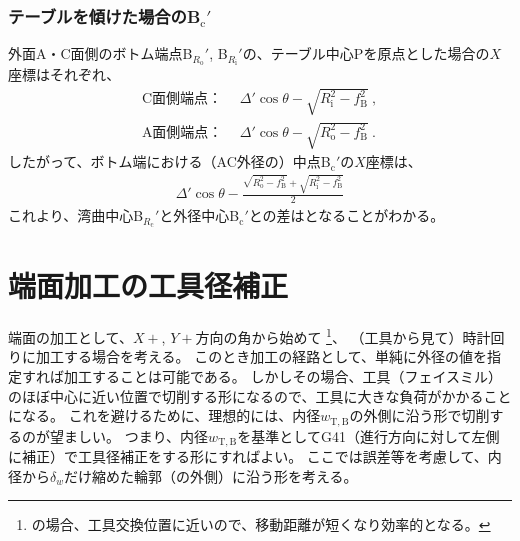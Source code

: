 \subsubsection{テーブルを傾けた場合のB\texorpdfstring{$_\mathrm c'$}{c'}}
外面A・C面側のボトム端点B$_{R_\mathrm o}'$, B$_{R_\mathrm i}'$の、テーブル中心Pを原点とした場合の$X$座標はそれぞれ、
\begin{align*}
  \text{C面側端点：}&~~
  \varDelta'\cos\theta-\sqrt{R_\mathrm i^2-f_\mathrm B^2}\ ,\\
  \text{A面側端点：}&~~
  \varDelta'\cos\theta-\sqrt{R_\mathrm o^2-f_\mathrm B^2}\ .
\end{align*}
したがって、ボトム端における（AC外径の）中点B$_\mathrm c'$の$X$座標は、
\begin{align}
  \label{eq:tableBc}
  \varDelta'\cos\theta-\frac{\sqrt{R_\mathrm o^2-f_\mathrm B^2}+\sqrt{R_\mathrm i^2-f_\mathrm B^2}}2
\end{align}
これより、湾曲中心B$_{R_\mathrm c}'$と外径中心B$_\mathrm c'$との差はとなることがわかる。




\clearpage
\section{端面加工の工具径補正}
端面の加工として、$X+$, $Y+$方向の角から始めて
\footnote{\DMname の場合、工具交換位置に近いので、移動距離が短くなり効率的となる。}、
（工具から見て）時計回りに加工する場合を考える。
このとき加工の経路として、単純に外径の値を指定すれば加工することは可能である。
しかしその場合、工具（フェイスミル）のほぼ中心に近い位置で切削する形になるので、工具に大きな負荷がかかることになる。
これを避けるために、理想的には、内径$w_{\mathrm T, \mathrm B}$の外側に沿う形で切削するのが望ましい。
つまり、内径$w_{\mathrm T, \mathrm B}$を基準としてG41（進行方向に対して左側に補正）で工具径補正をする形にすればよい。
ここでは誤差等を考慮して、内径から$\delta_w$だけ縮めた輪郭（の外側）に沿う形を考える。



